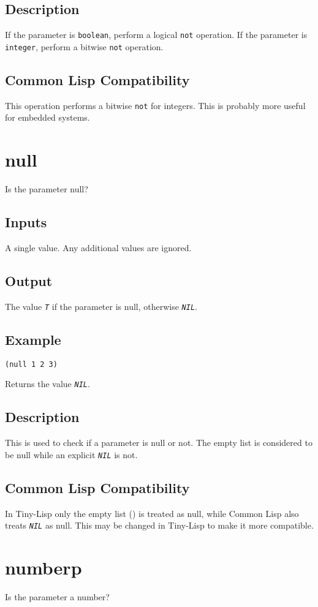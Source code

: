 \documentclass[10pt, openany]{book}
\newcommand{\constant}[1]{\emph{\texttt{#1}}}
\newcommand{\keyword}[1]{\texttt{#1}}
\newcommand{\datatype}[1]{\texttt{#1}}
\newcommand{\tl}{Tiny-Lisp}
\newcommand{\cl}{Common Lisp}
\begin{document}
\subsection{Description}
If the parameter is \datatype{boolean}, perform a logical \keyword{not} operation.  If the parameter is \datatype{integer}, perform a bitwise \keyword{not} operation.
\subsection{Common Lisp Compatibility}
This operation performs a bitwise \keyword{not} for integers.  This is probably more useful for embedded systems.

\section{null}
Is the parameter null?
\subsection{Inputs}
A single value.  Any additional values are ignored.
\subsection{Output}
The value \constant{T} if the parameter is null, otherwise \constant{NIL}.
\subsection{Example}
\begin{lstlisting}
(null 1 2 3)
\end{lstlisting}
Returns the value \constant{NIL}.
\subsection{Description}
This is used to check if a parameter is null or not.  The empty list is considered to be null while an explicit \constant{NIL} is not.
\subsection{Common Lisp Compatibility}
In \tl{} only the empty list () is treated as null, while \cl{} also treats \constant{NIL} as null.  This may be changed in \tl{} to make it more compatible.

\section{numberp}
Is the parameter a number?
\end{document}
